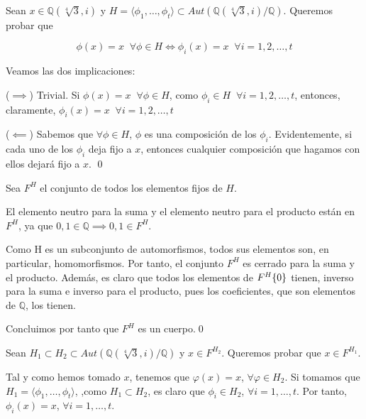 \documentclass[a4paper, 11pt]{article}
\begin{document}
  \begin{solucion}
      \begin{apartado}
          Sean $x\in\mathbb{Q}(\sqrt[4]{3},i)$ y $H=\langle\phi_1,\dots,\phi_t\rangle \subset Aut(\mathbb{Q}(\sqrt[4]{3},i)/\mathbb{Q})$. Queremos probar que

          \[
            \phi(x) = x \;\;\forall \phi\in H \iff \phi_i(x)=x \;\;\forall i = 1,2,\dots,t
          \]

          Veamos las dos implicaciones:

          ($\implies$) Trivial. Si $\phi(x) = x \;\;\forall \phi\in H$, como $\phi_i\in H \;\;\forall i = 1,2,\dots,t$, entonces, claramente, $\phi_i(x)=x \;\;\forall i = 1,2,\dots,t$

          ($\impliedby$) Sabemos que $\forall \phi\in H$, $\phi$ es una composición de los $\phi_i$. Evidentemente, si cada uno de los $\phi_i$ deja fijo a $x$, entonces cualquier composición que hagamos con ellos dejará fijo a $x$. \qed
      \end{apartado}

      \begin{apartado}
          Sea $F^H$ el conjunto de todos los elementos fijos de $H$.

          El elemento neutro para la suma y el elemento neutro para el producto están en $F^H$, ya que $0,1 \in \mathbb{Q} \implies 0,1\in F^H$.

          Como H es un subconjunto de automorfismos, todos sus elementos son, en particular, homomorfismos. Por tanto, el conjunto $F^H$ es cerrado para la suma y el producto. Además, es claro que todos los elementos de $F^H\\\{0\}$ tienen, inverso para la suma e inverso para el producto, pues los coeficientes, que son elementos de $\mathbb{Q}$, los tienen.

          Concluimos por tanto que $F^H$ es un cuerpo.\qed
      \end{apartado}

      \begin{apartado}
          Sean $H_1 \subset H_2 \subset Aut(\mathbb{Q}(\sqrt[4]{3},i)/\mathbb{Q})$ y $x \in F^{H_2}$. Queremos probar que $x \in F^{H_1}$.

          Tal y como hemos tomado $x$, tenemos que $\varphi(x) = x$, $\forall \varphi \in H_2$. Si tomamos que $H_1 = \langle \phi_1, \dots, \phi_t \rangle$,
          ,como $H_1 \subset H_2$, es claro que $\phi_i \in H_2$, $\forall i=1,\dots,t$. Por tanto, $\phi_i(x) = x$, $\forall i=1,\dots,t$.


\end{apartado}
\end{solucion}
\end{document}
